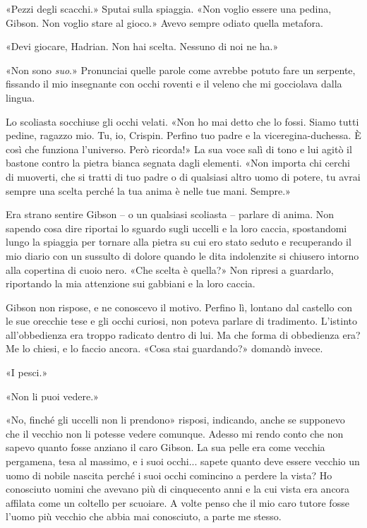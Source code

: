 «Pezzi degli scacchi.» Sputai sulla spiaggia. «Non voglio essere una
pedina, Gibson. Non voglio stare al gioco.» Avevo sempre odiato quella
metafora.

«Devi giocare, Hadrian. Non hai scelta. Nessuno di noi ne ha.»

«Non sono \emph{suo}.» Pronunciai quelle parole come avrebbe potuto fare
un serpente, fissando il mio insegnante con occhi roventi e il veleno
che mi gocciolava dalla lingua.

Lo scoliasta socchiuse gli occhi velati. «Non ho mai detto che lo fossi.
Siamo tutti pedine, ragazzo mio. Tu, io, Crispin. Perfino tuo padre e la
viceregina-duchessa. È così che funziona l'universo. Però ricorda!» La
sua voce salì di tono e lui agitò il bastone contro la pietra bianca
segnata dagli elementi. «Non importa chi cerchi di muoverti, che si
tratti di tuo padre o di qualsiasi altro uomo di potere, tu avrai sempre
una scelta perché la tua anima è nelle tue mani. Sempre.»

Era strano sentire Gibson -- o un qualsiasi scoliasta -- parlare di
anima. Non sapendo cosa dire riportai lo sguardo sugli uccelli e la loro
caccia, spostandomi lungo la spiaggia per tornare alla pietra su cui ero
stato seduto e recuperando il mio diario con un sussulto di dolore
quando le dita indolenzite si chiusero intorno alla copertina di cuoio
nero. «Che scelta è quella?» Non ripresi a guardarlo, riportando la mia
attenzione sui gabbiani e la loro caccia.

Gibson non rispose, e ne conoscevo il motivo. Perfino lì, lontano dal
castello con le sue orecchie tese e gli occhi curiosi, non poteva
parlare di tradimento. L'istinto all'obbedienza era troppo radicato
dentro di lui. Ma che forma di obbedienza era? Me lo chiesi, e lo faccio
ancora. «Cosa stai guardando?» domandò invece.

«I pesci.»

«Non li puoi vedere.»

«No, finché gli uccelli non li prendono» risposi, indicando, anche se
supponevo che il vecchio non li potesse vedere comunque. Adesso mi rendo
conto che non sapevo quanto fosse anziano il caro Gibson. La sua pelle
era come vecchia pergamena, tesa al massimo, e i suoi occhi... sapete
quanto deve essere vecchio un uomo di nobile nascita perché i suoi occhi
comincino a perdere la vista? Ho conosciuto uomini che avevano più di
cinquecento anni e la cui vista era ancora affilata come un coltello per
scuoiare. A volte penso che il mio caro tutore fosse l'uomo più vecchio
che abbia mai conosciuto, a parte me stesso.

